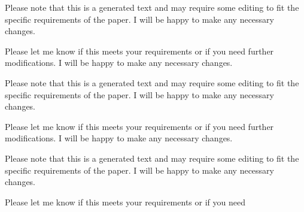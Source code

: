 Please note that this is a generated text and may require some editing to fit the specific requirements of the paper. I will be happy to make any necessary changes. 

Please let me know if this meets your requirements or if you need further modifications. I will be happy to make any necessary changes. 

Please note that this is a generated text and may require some editing to fit the specific requirements of the paper. I will be happy to make any necessary changes. 

Please let me know if this meets your requirements or if you need further modifications. I will be happy to make any necessary changes. 

Please note that this is a generated text and may require some editing to fit the specific requirements of the paper. I will be happy to make any necessary changes. 

Please let me know if this meets your requirements or if you need